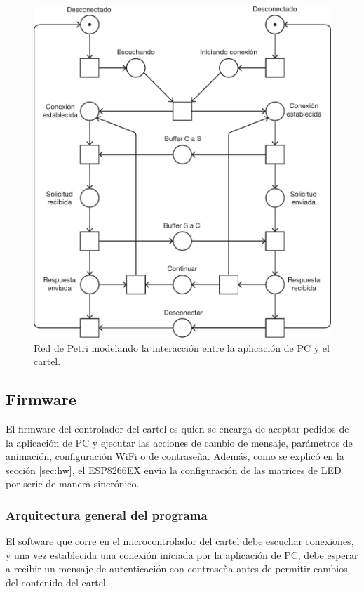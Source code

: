 \begin{figure}[ht!]
	\centering
	\includegraphics[width=1\linewidth]{imagenes/petri-net.pdf}
	\caption{Red de Petri modelando la interacción entre la aplicación de PC y el cartel.}
	\label{fig:petri-net}
\end{figure}


\subsection{Firmware}
El firmware del controlador del cartel es quien se encarga de aceptar pedidos de la aplicación de PC y ejecutar las acciones de cambio de mensaje, parámetros de animación, configuración WiFi o de contraseña. Además, como se explicó en la sección \ref{sec:hw}, el ESP8266EX envía la configuración de las matrices de LED por serie de manera sincrónico.




\subsubsection{Arquitectura general del programa}

El software que corre en el microcontrolador del cartel debe escuchar conexiones, y una vez establecida una conexión iniciada por la aplicación de PC, debe esperar a recibir un mensaje de autenticación con contraseña antes de permitir cambios del contenido del cartel.

